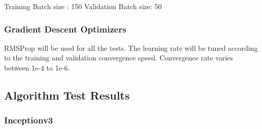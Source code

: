 \documentclass{article}
\begin{document}
Training Batch size : 150
Validation Batch size: 50

\subsubsection{Gradient Descent Optimizers}

RMSProp will be used for all the tests. The learning rate will be tuned according to the training and validation convergence speed. Convergence rate varies between 1e-4 to 1e-6.


\subsection{Algorithm Test Results}

\subsubsection{Inceptionv3}
\end{document}
